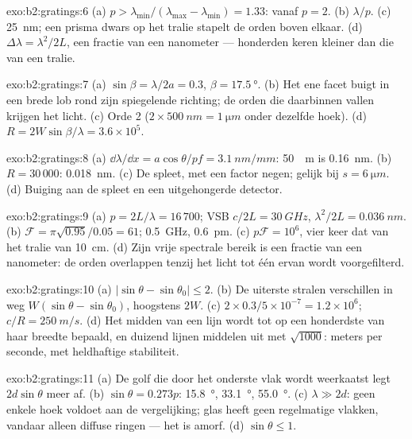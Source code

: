 \begin{solution}{exo:b2:gratings:6}
(a) $p > \lambda_{\min}/(\lambda_{\max} - \lambda_{\min}) = 1.33$: vanaf
$p = 2$. (b) $\lambda/p$. (c)
\qty{25}{nm}; een prisma dwars op het tralie stapelt de orden boven
elkaar. (d) $\Delta\lambda = \lambda^2/2L$, een fractie van een nanometer
--- honderden
keren kleiner dan die van een tralie.
\end{solution}

\begin{solution}{exo:b2:gratings:7}
(a) $\sin\beta = \lambda/2a = 0.3$, $\beta = \qty{17.5}{\degree}$. (b) Het
ene facet buigt
in een brede lob rond zijn spiegelende richting; de orden die
daarbinnen vallen krijgen het licht. (c) Orde 2
($2 \times \qty{500}{nm} = \qty{1}{\micro m}$ onder
dezelfde hoek). (d) $R = 2W\sin\beta/\lambda = 3.6 \times 10^5$.
\end{solution}

\begin{solution}{exo:b2:gratings:8}
(a) $\dd\lambda/\dd x = a\cos\theta/pf = \qty{3.1}{nm/mm}$: \qty{50}{\micro
m} is \qty{0.16}{nm}. (b)
$R = 30\,000$: \qty{0.018}{nm}. (c) De spleet, met een factor negen; gelijk
bij $s = \qty{6}{\micro m}$.
(d) Buiging aan de spleet en een uitgehongerde detector.
\end{solution}

\begin{solution}{exo:b2:gratings:9}
(a) $p = 2L/\lambda = 16\,700$; VSB $c/2L = \qty{30}{GHz}$,
$\lambda^2/2L = \qty{0.036}{nm}$. (b)
$\mathcal F
= \pi\sqrt{0.95}/0.05 = 61$; \qty{0.5}{GHz}, \qty{0.6}{pm}. (c)
$p\mathcal F = 10^6$, vier
keer dat van het tralie van \qty{10}{cm}. (d) Zijn vrije spectrale bereik is
een fractie
van een nanometer: de orden overlappen tenzij het licht tot één ervan
wordt voorgefilterd.
\end{solution}

\begin{solution}{exo:b2:gratings:10}
(a) $|\sin\theta - \sin\theta_0| \le 2$. (b) De uiterste stralen verschillen in weg
$W(\sin\theta - \sin\theta_0)$, hoogstens $2W$. (c)
$2 \times 0.3/5 \times 10^{-7} = 1.2 \times 10^6$; $c/R
= \qty{250}{m/s}$.
(d) Het midden van een lijn wordt tot op een honderdste van haar
breedte bepaald, en duizend lijnen middelen uit met $\sqrt{1000}$: meters per
seconde, met heldhaftige stabiliteit.
\end{solution}

\begin{solution}{exo:b2:gratings:11}
(a) De golf die door het onderste vlak wordt weerkaatst legt $2d\sin\theta$ meer af.
(b) $\sin\theta = 0.273p$: \qty{15.8}{\degree}, \qty{33.1}{\degree},
\qty{55.0}{\degree}. (c) $\lambda \gg 2d$:
geen enkele hoek voldoet aan de vergelijking; glas heeft geen regelmatige
vlakken, vandaar
alleen diffuse ringen --- het is amorf. (d) $\sin\theta \le 1$.
\end{solution}

